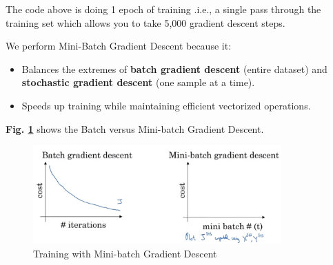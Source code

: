\documentclass[letterpaper,12pt,notitlepage,twoside]{report}
\begin{document}
The code above is doing 1 epoch of training .i.e., a single pass through the training set which allows you to take 5,000 gradient descent steps.

We perform Mini-Batch Gradient Descent because it:
\begin{itemize}
    \item Balances the extremes of \textbf{batch gradient descent} (entire dataset) and \textbf{stochastic gradient descent} (one sample at a time).
    \item Speeds up training while maintaining efficient vectorized operations.
\end{itemize}

\textbf{Fig. \ref{fig:18}} shows the Batch versus Mini-batch Gradient Descent.
\begin{figure}[h]
	\centering
	\includegraphics[width=0.85\textwidth]{Images/Batch vs Mini-batch GD.png}
	\caption{Training with Mini-batch Gradient Descent}
	\label{fig:18}
\end{figure}
\FloatBarrier
\end{document}
